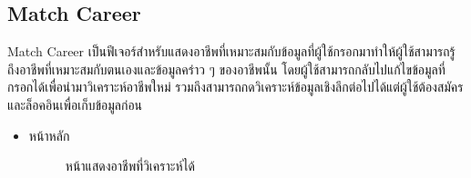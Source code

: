 \subsection {Match Career}
Match Career เป็นฟีเจอร์สำหรับแสดงอาชีพที่เหมาะสมกับข้อมูลที่ผู้ใช้กรอกมาทำให้ผู้ใช้สามารถรู้ถึงอาชีพที่เหมาะสมกับตนเองและข้อมูลคร่าว ๆ ของอาชีพนั้น โดยผู้ใช้สามารถกลับไปแก้ไขข้อมูลที่กรอกได้เพื่อนำมาวิเคราะห์อาชีพใหม่ รวมถึงสามารถกดวิเคราะห์ข้อมูลเชิงลึกต่อไปได้แต่ผู้ใช้ต้องสมัครและล็อคอินเพื่อเก็บข้อมูลก่อน
\begin{itemize}
    \item หน้าหลัก
    \begin{figure}[H]\centering
    \setlength{\fboxrule}{0.2mm} %
    \setlength{\fboxsep}{0.5cm}
  \caption{\centering หน้าแสดงอาชีพที่วิเคราะห์ได้}\label{fig:wireframe2_1}
\end{figure}
\end{itemize}

